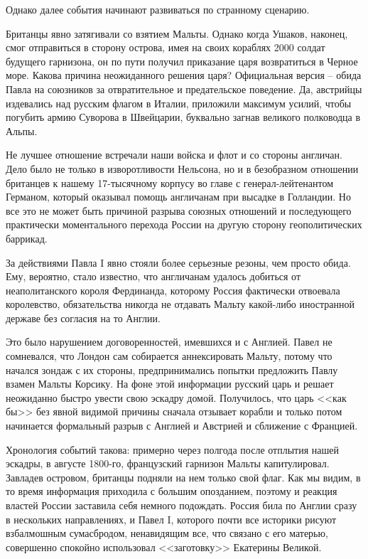 \documentclass[a4paper,12pt]{diss_4}
\begin{document}
Однако далее события начинают развиваться по странному сценарию.

Британцы явно затягивали со взятием Мальты. Однако когда Ушаков, наконец, смог отправиться в сторону острова, имея на своих кораблях 2000 солдат будущего гарнизона, он по пути получил приказание царя возвратиться в Черное море. Какова причина неожиданного решения царя? Официальная версия -- обида Павла на союзников за отвратительное и предательское поведение. Да, австрийцы издевались над русским флагом в Италии, приложили максимум усилий, чтобы погубить армию Суворова в Швейцарии, буквально загнав великого полководца в Альпы. 

Не лучшее отношение встречали наши войска и флот и со стороны англичан. Дело было не только в изворотливости Нельсона, но и в безобразном отношении британцев к нашему 17-тысячному корпусу во главе с генерал-лейтенантом Германом, который оказывал помощь англичанам при высадке в Голландии. Но все это не может быть причиной разрыва союзных отношений и последующего практически моментального перехода России на другую сторону геополитических баррикад. 

За действиями Павла I явно стояли более серьезные резоны, чем просто обида. Ему, вероятно, стало известно, что англичанам удалось добиться от неаполитанского короля Фердинанда, которому Россия фактически отвоевала королевство, обязательства никогда не отдавать Мальту какой-либо иностранной державе без согласия на то Англии. 

Это было нарушением договоренностей, имевшихся и с Англией. Павел не сомневался, что Лондон сам собирается аннексировать Мальту, потому что начался зондаж с их стороны, предпринимались попытки предложить Павлу взамен Мальты Корсику. На фоне этой информации русский царь и решает неожиданно быстро увести свою эскадру домой. Получилось, что царь <<как бы>> без явной видимой причины сначала отзывает корабли и только потом начинается формальный разрыв с Англией и Австрией и сближение с Францией.

 Хронология событий такова: примерно через полгода после отплытия нашей эскадры, в августе 1800-го, французский гарнизон Мальты капитулировал. Завладев островом, британцы подняли на нем только свой флаг. Как мы видим, в то время информация приходила с большим опозданием, поэтому и реакция властей России заставила себя немного подождать. Россия била по Англии сразу в нескольких направлениях, и Павел I, которого почти все историки рисуют взбалмошным сумасбродом, ненавидящим все, что связано с его матерью, совершенно спокойно использовал <<заготовку>> Екатерины Великой. 
\end{document}
